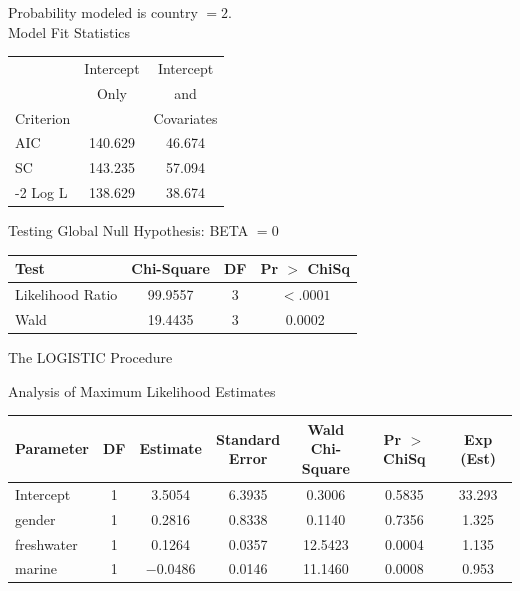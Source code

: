 
\begin{mvframe}[显示板 11.2(续)]
{\small
{\centering Probability modeled is country $=2$.\\[2pt] Model Fit Statistics\par}
\vspace{6pt}
{\centering
\begin{tabular}{lcc}
 & Intercept & Intercept\\
 & Only & and\\
Criterion & & Covariates\\
AIC & 140.629 & 46.674\\
SC & 143.235 & 57.094\\
-2 Log L & 138.629 & 38.674\\
\end{tabular}\par}
\vspace{10pt}
{\centering Testing Global Null Hypothesis: BETA $=0$\par}
\vspace{4pt}
{\centering
\begin{tabular}{lccc}
Test & Chi-Square & DF & Pr $>$ ChiSq\\
\hline
Likelihood Ratio & 99.9557 & 3 & $<.0001$\\
Wald & 19.4435 & 3 & 0.0002\\
\hline
\end{tabular}\par}
\vspace{10pt}
{\centering The LOGISTIC Procedure\par}
\vspace{6pt}
{\centering Analysis of Maximum Likelihood Estimates\par}
\vspace{4pt}
{\centering
\begin{tabular}{lcccccc}
Parameter & DF & Estimate & \makecell{Standard\\Error} & \makecell{Wald\\Chi-Square} & Pr $>$ ChiSq & Exp (Est)\\
\hline
Intercept & 1 & 3.5054 & 6.3935 & 0.3006 & 0.5835 & 33.293\\
gender & 1 & 0.2816 & 0.8338 & 0.1140 & 0.7356 & 1.325\\
freshwater & 1 & 0.1264 & 0.0357 & 12.5423 & 0.0004 & 1.135\\
marine & 1 & $-0.0486$ & 0.0146 & 11.1460 & 0.0008 & 0.953\\
\hline
\end{tabular}\par}
}
\end{mvframe}

